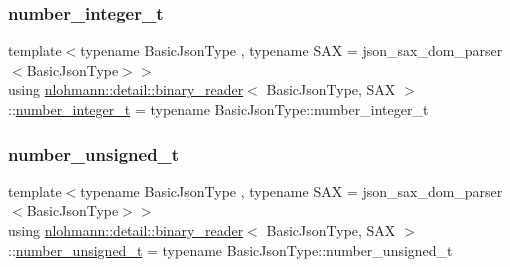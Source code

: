 \mbox{\label{classnlohmann_1_1detail_1_1binary__reader_aa093d9bce6c6ec715a049f2a26d7c4d5}} 
\subsubsection{\texorpdfstring{number\+\_\+integer\+\_\+t}{number\_integer\_t}}
{\footnotesize\ttfamily template$<$typename Basic\+Json\+Type , typename S\+AX  = json\+\_\+sax\+\_\+dom\+\_\+parser$<$\+Basic\+Json\+Type$>$$>$ \\
using \hyperlink{classnlohmann_1_1detail_1_1binary__reader}{nlohmann\+::detail\+::binary\+\_\+reader}$<$ Basic\+Json\+Type, S\+AX $>$\+::\hyperlink{classnlohmann_1_1detail_1_1binary__reader_aa093d9bce6c6ec715a049f2a26d7c4d5}{number\+\_\+integer\+\_\+t} =  typename Basic\+Json\+Type\+::number\+\_\+integer\+\_\+t\hspace{0.3cm}{\ttfamily [private]}}

\mbox{\label{classnlohmann_1_1detail_1_1binary__reader_a13bb5e2014c4cdf013d8715157cb456e}} 
\subsubsection{\texorpdfstring{number\+\_\+unsigned\+\_\+t}{number\_unsigned\_t}}
{\footnotesize\ttfamily template$<$typename Basic\+Json\+Type , typename S\+AX  = json\+\_\+sax\+\_\+dom\+\_\+parser$<$\+Basic\+Json\+Type$>$$>$ \\
using \hyperlink{classnlohmann_1_1detail_1_1binary__reader}{nlohmann\+::detail\+::binary\+\_\+reader}$<$ Basic\+Json\+Type, S\+AX $>$\+::\hyperlink{classnlohmann_1_1detail_1_1binary__reader_a13bb5e2014c4cdf013d8715157cb456e}{number\+\_\+unsigned\+\_\+t} =  typename Basic\+Json\+Type\+::number\+\_\+unsigned\+\_\+t\hspace{0.3cm}{\ttfamily [private]}}

